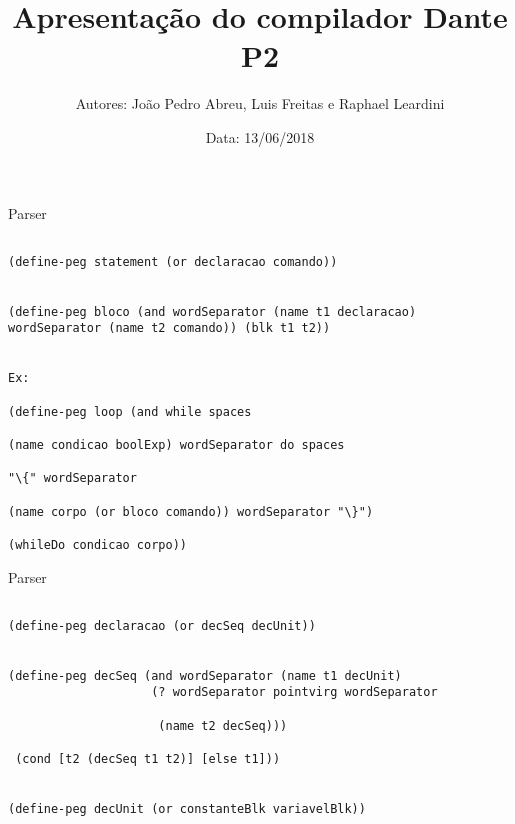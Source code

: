 \documentclass{beamer}
\title[Compiladores 2018.1]{Apresentação do compilador Dante P2}
\author[Abrev.]{Autores: João Pedro Abreu, Luis Freitas e Raphael Leardini}
\institute[UFF]{Universidade Federal Fluminense}
\date{Data: 13/06/2018}
\begin{document}

\begin{frame}[plain]

\titlepage

\end{frame}


\begin{frame}{Parser}
\begin{verbatim}

(define-peg statement (or declaracao comando))


(define-peg bloco (and wordSeparator (name t1 declaracao) wordSeparator (name t2 comando)) (blk t1 t2))


Ex:

(define-peg loop (and while spaces 

(name condicao boolExp) wordSeparator do spaces 

"\{" wordSeparator 

(name corpo (or bloco comando)) wordSeparator "\}") 

(whileDo condicao corpo))

\end{verbatim}

\end{frame}

\begin{frame}{Parser}
\begin{verbatim}

(define-peg declaracao (or decSeq decUnit))


(define-peg decSeq (and wordSeparator (name t1 decUnit) 
                    (? wordSeparator pointvirg wordSeparator 
                     
                     (name t2 decSeq))) 
 
 (cond [t2 (decSeq t1 t2)] [else t1]))


(define-peg decUnit (or constanteBlk variavelBlk))

\end{verbatim}

\end{frame}
\end{document}
